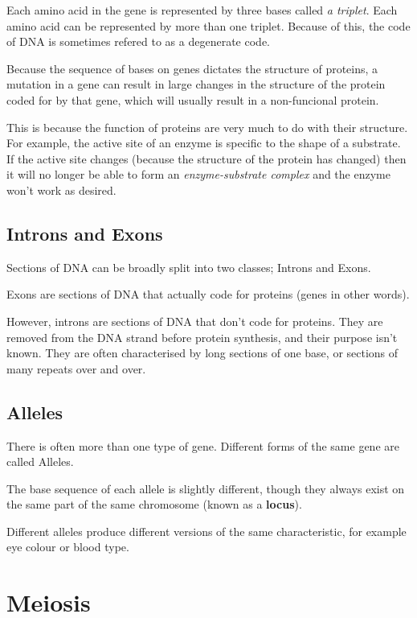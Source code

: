 \documentclass{article}
\begin{document}
Each amino acid in the gene is represented by three bases called {\it a
triplet}. Each amino acid can be represented by more than one triplet. Because
of this, the code of DNA is sometimes refered to as a degenerate code.

Because the sequence of bases on genes dictates the structure of proteins, a
mutation in a gene can result in large changes in the structure of the protein
coded for by that gene, which will usually result in a non-funcional protein.

This is because the function of proteins are very much to do with their
structure. For example, the active site of an enzyme is specific to the shape of
a substrate. If the active site changes (because the structure of the protein
has changed) then it will no longer be able to form an {\it enzyme-substrate
complex} and the enzyme won't work as desired.

\subsection*{Introns and Exons}

Sections of DNA can be broadly split into two classes; Introns and Exons.

Exons are sections of DNA that actually code for proteins (genes in other
words).

However, introns are sections of DNA that don't code for proteins. They are
removed from the DNA strand before protein synthesis, and their purpose isn't
known. They are often characterised by long sections of one base, or sections of
many repeats over and over.

\subsection*{Alleles}

There is often more than one type of gene. Different forms of the same gene are
called Alleles.

The base sequence of each allele is slightly different, though they always exist
on the same part of the same chromosome (known as a {\bf locus}).

Different alleles produce different versions of the same characteristic, for
example eye colour or blood type.

\section*{Meiosis}
\end{document}
